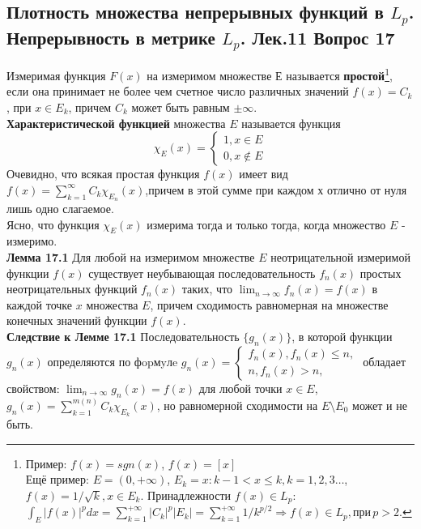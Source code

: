 \documentclass{article}
\begin{document}
\subsection{Плотность множества непрерывных функций в ${L}_{p}$. Непрерывность в метрике ${L}_{p}$. Лек.11 \textbf{Вопрос 17}}
	Измеримая функция $F(x)$ на измеримом множестве $Е$ называется \textbf{простой}\footnote{Пример: $f(x)=sgn(x)$, $f(x)=[x]$\\
	Ещё пример: $E=(0,+\infty)$, ${E}_{k}={x:k-1<x\le k}, k=1,2,3\ldots$, $f(x)= 1/\sqrt{k},x\in {E}_{k}$. Принадлежности $f(x)\in {L}_{p}$:
	$\int_{E} {|f(x)|}^{p}dx=\sum_{k=1}^{+\infty} {|{C}_{k}|}^{p}|{E}_{k}|=\sum_{k=1}^{+\infty} 1/{k}^{p/2}
	\Rightarrow  f(x)\in {L}_{p}, \text{при}\,p>2.$}, если она принимает не более чем счетное число различных значений $f(x)=C_{k}$, при $x \in {E}_{k}$, причем ${C}_{k}$ может быть равным $\pm \infty$.\\
	\textbf{Характеристической функцией} множества $E$ называется функция
	\begin{equation}
	\chi_{E}(x)=\left\{\begin{array}{l}1, x\in E\\ 0, x\notin E\end{array}\right. 
	\end{equation}
	Очевидно, что всякая простая функция $f(x)$ имеет вид  $f(x)=\sum_{k=1}^{\infty} {C}_{k}\chi_{{E}_{n}}(x)$,причем в этой
	сумме при каждом $х$ отлично от нуля лишь одно слагаемое.\\
	Ясно, что функция $\chi_{E}(x)$ измерима тогда и только тогда, когда множество $E$ - измеримо.\\
	\textbf{Лемма 17.1} Для любой на измеримом множестве $E$ неотрицательной измеримой функции $f(x)$ существует неубывающая последовательность ${{f}_{n}(x)}$ простых
	неотрицательных функций ${f}_{n}(x)$ таких, что $\lim_{n \rightarrow \infty} {f}_{n}(x)=f(x)$ в каждой точке $x$ множества $E$, причем сходимость равномерная на множестве конечных значений функции $f(x)$.\\
	\textbf{Следствие к Лемме 17.1} Последовательность $\{{g}_{n}(x)\}$, в которой функции ${g}_{n}(x)$ определяются по фopмyлe  ${g}_{n}(x)=\left\{\begin{array}{c}f_{n}(x), f_{n}(x) \leq n, \\ n, f_{n}(x)>n,\end{array}\right.$ обладает свойством: $\lim_{n \rightarrow \infty} {g}_{n}(x)=f(x)$ для любой точки $x\in E$, ${g}_{n}(x)=\sum_{k=1}^{m(n)} C_{k} \chi_{E_{k}}(x)$, но равномерной сходимости на $E\setminus {E}_{0}$ может и не быть.\\
\end{document}
